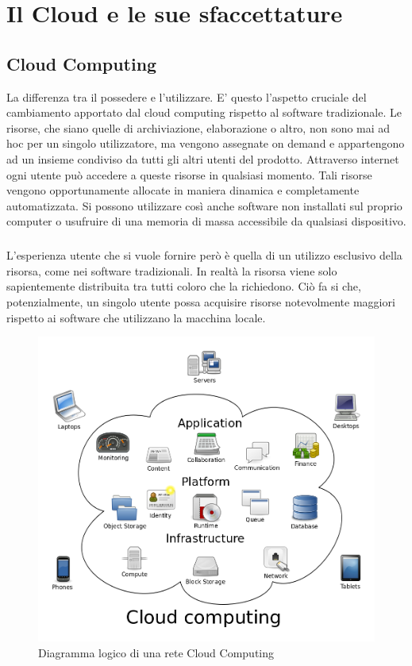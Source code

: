 \chapter{Il Cloud e le sue sfaccettature}

\section{Cloud Computing}
La differenza tra il possedere e l'utilizzare. E' questo l'aspetto cruciale del cambiamento apportato dal cloud computing rispetto al software tradizionale. Le risorse, che siano quelle di archiviazione, elaborazione o altro, non sono mai ad hoc per un singolo utilizzatore, ma vengono assegnate on demand e appartengono ad un insieme condiviso da tutti gli altri utenti del prodotto. Attraverso internet ogni utente può accedere a queste risorse in qualsiasi momento. Tali risorse vengono opportunamente allocate in maniera dinamica e completamente automatizzata. Si possono utilizzare così anche software non installati sul proprio computer o usufruire di una memoria di massa accessibile da qualsiasi dispositivo.
\paragraph{}
L'esperienza utente che si vuole fornire però è quella di un utilizzo esclusivo della risorsa, come nei software tradizionali. In realtà la risorsa viene solo sapientemente distribuita tra tutti coloro che la richiedono. Ciò fa si che, potenzialmente, un singolo utente possa acquisire risorse notevolmente maggiori rispetto ai software che utilizzano la macchina locale.
\begin{figure}
	\centering
	\includegraphics[width=0.5\linewidth]{capitoli/imgs/CloudComputing}
	\caption{Diagramma logico di una rete Cloud Computing}
	\label{fig:cloudcomputing}
\end{figure}
